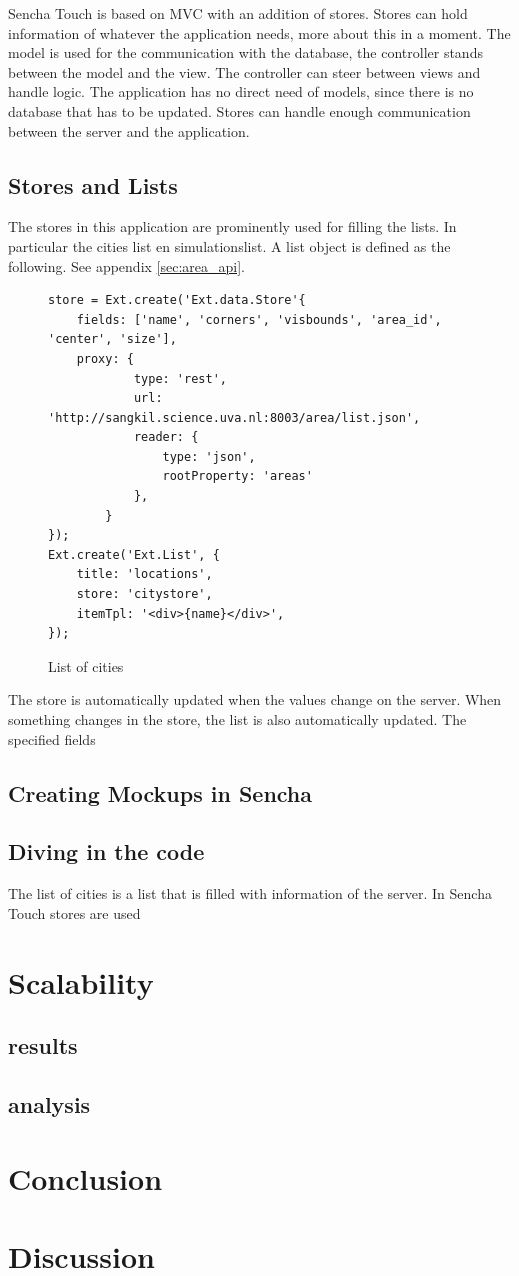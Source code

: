 Sencha Touch is based on MVC with an addition of stores. Stores can hold information of whatever the application needs, more about this in a moment. The model is used for the communication with the database, the controller stands between the model and the view. The controller can steer between views and handle logic. The application has no direct need of models, since there is no database that has to be updated. Stores can handle enough communication between the server and the application. 

\subsection{Stores and Lists}
The stores in this application are prominently used for filling the lists. In particular the cities list en simulationslist. A list object is defined as the following. See appendix \ref{sec:area_api}.

\begin{figure}[h!]
\begin{lstlisting}
store = Ext.create('Ext.data.Store'{
    fields: ['name', 'corners', 'visbounds', 'area_id', 'center', 'size'],
	proxy: {
			type: 'rest',
			url: 'http://sangkil.science.uva.nl:8003/area/list.json',
			reader: {
				type: 'json',
				rootProperty: 'areas'
			},
		}
});
Ext.create('Ext.List', {
	title: 'locations',
	store: 'citystore',
	itemTpl: '<div>{name}</div>',
});
\end{lstlisting}
\caption{List of cities}
\label{fig:sencha}
\end{figure}
The store is automatically updated when the values change on the server. When something changes in the store, the list is also automatically updated. The specified fields 

\subsection{Creating Mockups in Sencha}


\subsection{Diving in the code}
The list of cities is a list that is filled with information of the server. In Sencha Touch stores are used 


\section{Scalability}

\subsection{results}

\subsection{analysis}

\section{Conclusion}

\section{Discussion}

